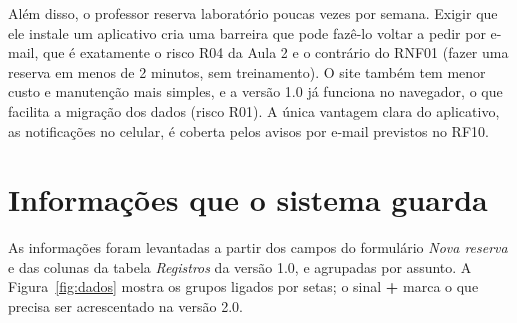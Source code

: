 \documentclass[a4paper,12pt]{article}
\begin{document}
Além disso, o professor reserva laboratório poucas vezes por semana.
Exigir que ele instale um aplicativo cria uma barreira que pode fazê-lo
voltar a pedir por e-mail, que é exatamente o risco R04 da Aula 2 e o
contrário do RNF01 (fazer uma reserva em menos de 2 minutos, sem
treinamento). O site também tem menor custo e manutenção mais simples,
e a versão 1.0 já funciona no navegador, o que facilita a migração dos
dados (risco R01). A única vantagem clara do aplicativo, as notificações
no celular, é coberta pelos avisos por e-mail previstos no RF10.

\section{Informações que o sistema guarda}

As informações foram levantadas a partir dos campos do formulário
\emph{Nova reserva} e das colunas da tabela \emph{Registros} da versão
1.0, e agrupadas por assunto. A Figura~\ref{fig:dados} mostra os grupos
ligados por setas; o sinal \textbf{+} marca o que precisa ser
acrescentado na versão 2.0.

\begin{center}
  
  \label{fig:dados}
\end{center}
\end{document}
